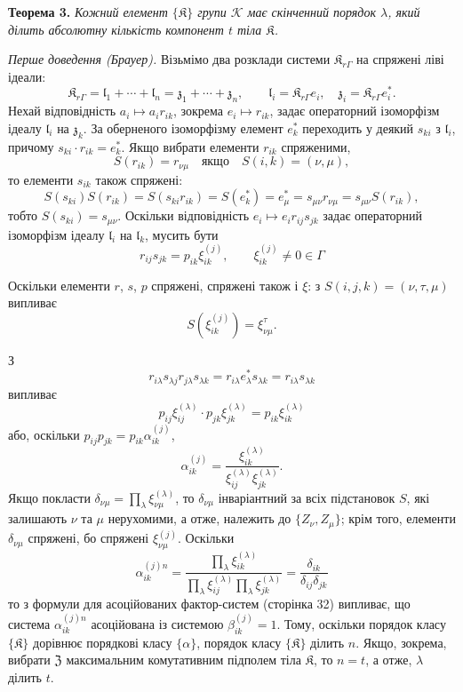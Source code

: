 \documentclass[11pt]{article}
\begin{document}
\textbf{Теорема 3.} \emph{Кожний елемент \(\{\mathfrak K\}\) групи \(\mathscr K\) має скінченний порядок \(\lambda\), який ділить абсолютну кількість компонент \(t\) тіла \(\mathfrak K\).}

\emph{Перше доведення (Брауер).} Візьмімо два розклади системи \(\mathfrak K_{r\Gamma}\) на спряжені ліві ідеали:
\[
\mathfrak K_{r\Gamma}=\mathfrak l_1+\cdots+\mathfrak l_n=\mathfrak z_1+\cdots+\mathfrak z_n,\qquad
\mathfrak l_i=\mathfrak K_{r\Gamma}e_i,\quad
\mathfrak z_i=\mathfrak K_{r\Gamma}e_i^*.
\]
Нехай відповідність \(a_i\mapsto a_ir_{ik}\), зокрема \(e_i\mapsto r_{ik}\), задає операторний ізоморфізм ідеалу \(\mathfrak l_i\) на \(\mathfrak z_k\). За оберненого ізоморфізму елемент \(e_k^*\) переходить у деякий \(s_{ki}\) з \(\mathfrak l_i\), причому \(s_{ki}\cdot r_{ik}=e_k^*\). Якщо вибрати елементи \(r_{ik}\) спряженими,
\[
S(r_{ik})=r_{\nu\mu}\quad\text{якщо}\quad S(i,k)=(\nu,\mu),
\]
то елементи \(s_{ik}\) також спряжені:
\[
S(s_{ki})S(r_{ik})=S(s_{ki}r_{ik})=S(e_k^*)=e_\mu^*
=s_{\mu\nu}r_{\nu\mu}=s_{\mu\nu}S(r_{ik}),
\]
тобто \(S(s_{ki})=s_{\mu\nu}\). Оскільки відповідність \(e_i\mapsto e_ir_{ij}s_{jk}\) задає операторний ізоморфізм ідеалу \(\mathfrak l_i\) на \(\mathfrak l_k\), мусить бути
\[
r_{ij}s_{jk}=p_{ik}\xi_{ik}^{(j)},\qquad
\xi_{ik}^{(j)}\ne0\in\Gamma
\]

Оскільки елементи \(r\), \(s\), \(p\) спряжені, спряжені також і \(\xi\): з \(S(i,j,k)=(\nu,\tau,\mu)\) випливає
\[
S(\xi_{ik}^{(j)})=\xi_{\nu\mu}^{\tau}.
\]

З
\[
r_{i\lambda}s_{\lambda j}r_{j\lambda}s_{\lambda k}
=r_{i\lambda}e_\lambda^*s_{\lambda k}
=r_{i\lambda}s_{\lambda k}
\]
випливає
\[
p_{ij}\xi_{ij}^{(\lambda)}\cdot p_{jk}\xi_{jk}^{(\lambda)}
=p_{ik}\xi_{ik}^{(\lambda)}
\]
або, оскільки \(p_{ij}p_{jk}=p_{ik}\alpha_{ik}^{(j)}\),
\[
\alpha_{ik}^{(j)}
=\frac{\xi_{ik}^{(\lambda)}}{\xi_{ij}^{(\lambda)}\xi_{jk}^{(\lambda)}}.
\]
Якщо покласти \(\delta_{\nu\mu}=\prod_{\lambda}\xi_{\nu\mu}^{(\lambda)}\), то \(\delta_{\nu\mu}\) інваріантний за всіх підстановок \(S\), які залишають \(\nu\) та \(\mu\) нерухомими, а отже, належить до \(\{Z_\nu,Z_\mu\}\); крім того, елементи \(\delta_{\nu\mu}\) спряжені, бо спряжені \(\xi_{\nu\mu}^{(j)}\). Оскільки
\[
\alpha_{ik}^{(j)n}
=\frac{\prod_{\lambda}\xi_{ik}^{(\lambda)}}
       {\prod_{\lambda}\xi_{ij}^{(\lambda)}\prod_{\lambda}\xi_{jk}^{(\lambda)}}
=\frac{\delta_{ik}}{\delta_{ij}\delta_{jk}}
\]
то з формули для асоційованих фактор-систем (сторінка 32) випливає, що система \(\alpha_{ik}^{(j)n}\) асоційована із системою \(\beta_{ik}^{(j)}=1\). Тому, оскільки порядок класу \(\{\mathfrak K\}\) дорівнює порядкові класу \(\{\alpha\}\), порядок класу \(\{\mathfrak K\}\) ділить \(n\). Якщо, зокрема, вибрати \(\mathfrak Z\) максимальним комутативним підполем тіла \(\mathfrak K\), то \(n=t\), а отже, \(\lambda\) ділить \(t\).
\end{document}
